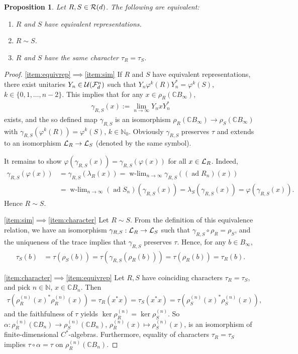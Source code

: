 \documentclass[12pt,a4paper]{amsart}
\numberwithin{equation}{section}
\newtheorem{proposition}[theorem]{Proposition}
\theoremstyle{remark}
\def\ker{\operatorname{ker}}
\DeclareMathOperator*{\wlim}{w-lim}
\DeclareMathOperator{\ad}{ad}
\newcommand{\Cl}{\mathbb{C}}
\newcommand{\Nl}{\mathbb{N}}
\newcommand{\la}{\lambda}
\newcommand{\CU}[0]{\mathcal{U}} \newcommand{\CV}[0]{\mathcal{V}}
\begin{document}
\begin{proposition}\label{prop:character}
    Let $R,S\in\mathcal{R}(d)$. The following are equivalent:
    \begin{enumerate}
		\item\label{item:equivrep} $R$ and $S$ have equivalent representations.
		\item\label{item:sim} $R\sim S$.
		\item\label{item:character} $R$ and $S$ have the same character $\tau_R=\tau_S$.
    \end{enumerate}
\end{proposition}
\begin{proof}
	\ref{item:equivrep}$\implies$\ref{item:sim} If $R$ and $S$ have equivalent representations, there exist unitaries $Y_n\in\CU(\CF_d^n)$ such that $Y_n\varphi^k(R)Y_n^*=\varphi^k(S)$, $k\in\{0,1,\ldots,n-2\}$. This implies that for any $x\in\rho_R(\Cl B_\infty)$,
	\begin{align}\label{eq:gammalimit}
	 \gamma_{R,S}(x):=\lim_{n\to\infty}Y_nxY_n^*
	\end{align}
	exists, and the so defined map $\gamma_{R,S}$ is an isomorphism $\rho_R(\Cl B_\infty)\to\rho_S(\Cl B_\infty)$ with $\gamma_{R,S}(\varphi^k(R))=\varphi^k(S)$, $k\in\Nl_0$. Obviously $\gamma_{R,S}$ preserves $\tau$ and extends to an isomorphism $\mathcal{L}_R\to\mathcal{L}_S$ (denoted by the same symbol). 
	
	It remains to show $\varphi(\gamma_{R,S}(x))=\gamma_{R,S}(\varphi(x))$ for all $x\in\mathcal{L}_R$. Indeed,
	\begin{align*}
		\gamma_{R,S}(\varphi(x))
		&=
		\gamma_{R,S}(\la_R(x))
		=
		\wlim_{n\to\infty}\gamma_{R,S}((\ad R_n)(x))
		\\
		&=
		\wlim_{n\to\infty}(\ad S_n)(\gamma_{R,S}(x))
		=
		\la_S(\gamma_{R,S}(x))
		=
		\varphi(\gamma_{R,S}(x))
		.
	\end{align*}
	Hence $R\sim S$.
	
	\ref{item:sim}$\implies$\ref{item:character} Let $R\sim S$. From the definition of this equivalence relation, we have an isomorphism $\gamma_{R,S}:\mathcal{L}_R\to\mathcal{L}_S$ such that $\gamma_{R,S}\circ\rho_R=\rho_S$, and the uniqueness of the trace implies that $\gamma_{R,S}$ preserves $\tau$. Hence, for any $b\in B_\infty$,
	\begin{align*}
	 \tau_S(b)
	 &=
	 \tau(\rho_S(b))
	 =
	 \tau(\gamma_{R,S}(\rho_R(b)))
	 =
	 \tau(\rho_R(b))
	 =
	 \tau_R(b).
	\end{align*}

	\ref{item:character}$\implies$\ref{item:equivrep} 
	Let $R,S$ have coinciding characters $\tau_R=\tau_S$, and pick $n\in\Nl$, $x\in\Cl B_n$. Then
    \begin{align*}
     \tau(\rho_R^{(n)}(x)^*\rho_R^{(n)}(x))=\tau_R(x^*x)=\tau_S(x^*x)=\tau(\rho_S^{(n)}(x)^*\rho_S^{(n)}(x)),
    \end{align*}
    and the faithfulness of $\tau$ yields $\ker\rho_R^{(n)}=\ker\rho_S^{(n)}$. So $\alpha:\rho_R^{(n)}(\Cl B_n)\to\rho_S^{(n)}(\Cl B_n)$, $\rho_R^{(n)}(x)\mapsto \rho_S^{(n)}(x)$, is an isomorphism of finite-dimensional $C^*$-algebras. Furthermore, equality of characters $\tau_R=\tau_S$ implies $\tau\circ\alpha=\tau$ on $\rho_R^{(n)}(\Cl B_n)$.
    

\end{proof}
\end{document}
